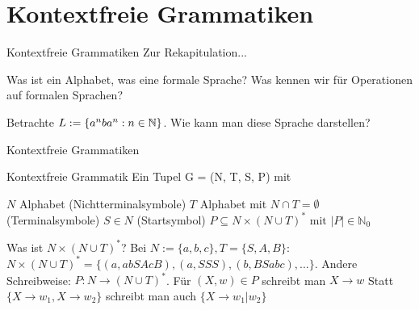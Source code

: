 \def\tutdate{8.12.2016}


\section{Kontextfreie Grammatiken}
\begin{frame}{Kontextfreie Grammatiken}
	\ip Zur Rekapitulation...
	
	\begin{itemize}
		\pitem Was ist ein Alphabet, was eine formale Sprache?
		\pitem Was kennen wir für Operationen auf formalen Sprachen?
	\end{itemize}

	\bp 
	
	Betrachte $L := \{a^nba^n : n \in \mathbb{N} \}$. \ip Wie kann man diese Sprache darstellen?
\end{frame}

\begin{frame}{Kontextfreie Grammatiken}
	\begin{block}{Kontextfreie Grammatik}
		Ein Tupel G = (N, T, S, P) mit
		\begin{itemize}
			\pitem $N$ Alphabet (Nichtterminalsymbole)
			\pitem $T$ Alphabet mit $N \cap T = \emptyset$ (Terminalsymbole)
			\pitem $S \in N$ (Startsymbol)
			\pitem $P \subseteq N \times (N \cup T)^* \text{ mit } |P| \in \mathbb{N}_0$
		\end{itemize}
	\end{block}

	\begin{itemize}
		\pitem Was ist $N \times (N \cup T)^*$? \pause Bei $N := \{a,b,c\}, T = \{S, A, B\}$\ip : $N \times (N \cup T)^* = \{(a, abSAcB), (a, SSS), (b, BSabc), ...\}$.
		\pitem Andere Schreibweise: $P : N \rightarrow (N \cup T)^*$.
		\pitem Für $(X, w) \in P$ schreibt man $X \rightarrow w$
		\pitem Statt $\{X\rightarrow w_1, X \rightarrow w_2 \}$ schreibt man auch $\{X \rightarrow w_1 | w_2\}$
	\end{itemize}
	
\end{frame}

